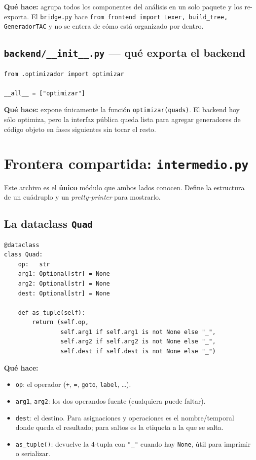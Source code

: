 \documentclass[11pt,a4paper]{article}
\begin{document}
\textbf{Qué hace:} agrupa todos los componentes del análisis en un solo paquete
y los re-exporta. El \texttt{bridge.py} hace
\texttt{from frontend import Lexer, build\_tree, GeneradorTAC} y no se entera
de cómo está organizado por dentro.

\subsection{\texttt{backend/\_\_init\_\_.py} --- qué exporta el backend}

\begin{lstlisting}[style=py]
from .optimizador import optimizar

__all__ = ["optimizar"]
\end{lstlisting}

\textbf{Qué hace:} expone únicamente la función \texttt{optimizar(quads)}.
El backend hoy sólo optimiza, pero la interfaz pública queda lista para
agregar generadores de código objeto en fases siguientes sin tocar el resto.

\section{Frontera compartida: \texttt{intermedio.py}}

Este archivo es el \textbf{único} módulo que ambos lados conocen. Define la
estructura de un cuádruplo y un \textit{pretty-printer} para mostrarlo.

\subsection{La dataclass \texttt{Quad}}

\begin{lstlisting}[style=py]
@dataclass
class Quad:
    op:   str
    arg1: Optional[str] = None
    arg2: Optional[str] = None
    dest: Optional[str] = None

    def as_tuple(self):
        return (self.op,
                self.arg1 if self.arg1 is not None else "_",
                self.arg2 if self.arg2 is not None else "_",
                self.dest if self.dest is not None else "_")
\end{lstlisting}

\textbf{Qué hace:}
\begin{itemize}[leftmargin=*,nosep]
  \item \texttt{op}: el operador (\texttt{+}, \texttt{=}, \texttt{goto}, \texttt{label}, \dots).
  \item \texttt{arg1}, \texttt{arg2}: los dos operandos fuente (cualquiera puede faltar).
  \item \texttt{dest}: el destino. Para asignaciones y operaciones es el
        nombre/temporal donde queda el resultado; para saltos es la etiqueta
        a la que se salta.
  \item \texttt{as\_tuple()}: devuelve la 4-tupla con \texttt{"\_"} cuando hay
        \texttt{None}, útil para imprimir o serializar.
\end{itemize}
\end{document}
